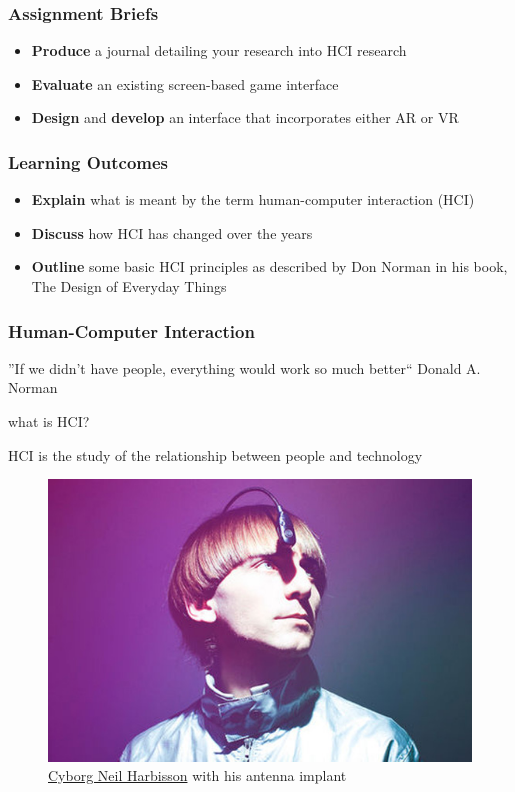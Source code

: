 \begin{frame}
	\frametitle{Assignment Briefs}
	\begin{itemize}
		\item \textbf{Produce} a journal detailing your research into HCI research
		\item \textbf{Evaluate} an existing screen-based game interface
		\item \textbf{Design} and \textbf{develop} an interface that incorporates either AR or VR
	\end{itemize}
\end{frame}

\begin{frame}
	\frametitle{Learning Outcomes }
	
	\begin{itemize}
		\item \textbf{Explain} what is meant by the term human-computer interaction (HCI)
		\item \textbf{Discuss} how HCI has changed over the years
		\item \textbf{Outline} some basic HCI principles as described by Don Norman in his book, The Design of Everyday Things  
	\end{itemize}
\end{frame}

\begin{frame}
	\frametitle{Human-Computer Interaction}
	''If we didn't have people, everything would work so much better`` Donald A. Norman
	
	\begin{center}
		\huge what is HCI?
	\end{center}
\end{frame}

\begin{frame}
	\begin{center}
	HCI is the study of the relationship between people and technology
	\end{center}
	\begin{figure}
		\includegraphics[scale=.45]{assets/cyborgist}
		\caption{\href{https://www.youtube.com/watch?v=C_OnYqx3ynA}{Cyborg Neil Harbisson} with his antenna implant}
	\end{figure}
\end{frame}

